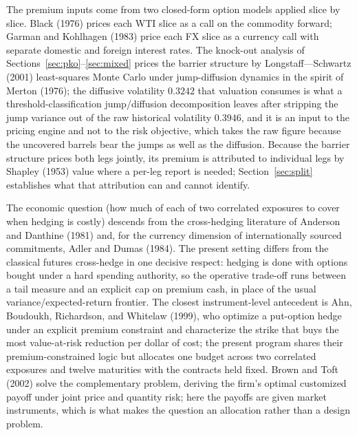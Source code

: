 \documentclass[11pt,a4paper]{article}
\begin{document}
The premium inputs come from two closed-form option models applied slice by slice. Black (1976) prices each WTI slice as a call on the commodity forward; Garman and Kohlhagen (1983) price each FX slice as a currency call with separate domestic and foreign interest rates. The knock-out analysis of Sections~\ref{sec:pko}--\ref{sec:mixed} prices the barrier structure by Longstaff---Schwartz (2001) least-squares Monte Carlo under jump-diffusion dynamics in the spirit of Merton (1976); the diffusive volatility $0.3242$ that valuation consumes is what a threshold-classification jump/diffusion decomposition leaves after stripping the jump variance out of the raw historical volatility $0.3946$, and it is an input to the pricing engine and not to the risk objective, which takes the raw figure because the uncovered barrels bear the jumps as well as the diffusion. Because the barrier structure prices both legs jointly, its premium is attributed to individual legs by Shapley (1953) value where a per-leg report is needed; Section~\ref{sec:split} establishes what that attribution can and cannot identify.

The economic question (how much of each of two correlated exposures to cover when hedging is costly) descends from the cross-hedging literature of Anderson and Danthine (1981) and, for the currency dimension of internationally sourced commitments, Adler and Dumas (1984). The present setting differs from the classical futures cross-hedge in one decisive respect: hedging is done with options bought under a hard spending authority, so the operative trade-off runs between a tail measure and an explicit cap on premium cash, in place of the usual variance/expected-return frontier. The closest instrument-level antecedent is Ahn, Boudoukh, Richardson, and Whitelaw (1999), who optimize a put-option hedge under an explicit premium constraint and characterize the strike that buys the most value-at-risk reduction per dollar of cost; the present program shares their premium-constrained logic but allocates one budget across two correlated exposures and twelve maturities with the contracts held fixed. Brown and Toft (2002) solve the complementary problem, deriving the firm's optimal customized payoff under joint price and quantity risk; here the payoffs are given market instruments, which is what makes the question an allocation rather than a design problem.
\end{document}
